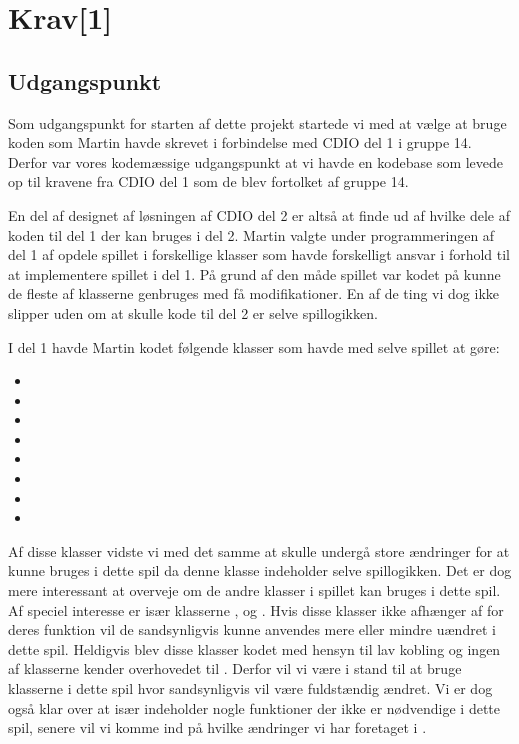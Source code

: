 \chapter{Krav[1]}\label{chap:krav}

\section{Udgangspunkt}\label{sec:krav:kravUdgangspunkt}
Som udgangspunkt for starten af dette projekt startede vi med at vælge at bruge koden som Martin havde skrevet i forbindelse med CDIO del 1 i gruppe 14. Derfor var vores kodemæssige udgangspunkt at vi havde en kodebase som levede op til kravene fra CDIO del 1 som de blev fortolket af gruppe 14.

En del af designet af løsningen af CDIO del 2 er altså at finde ud af hvilke dele af koden til del 1 der kan bruges i del 2. Martin valgte under programmeringen af del 1 af opdele spillet i forskellige klasser som havde forskelligt ansvar i forhold til at implementere spillet i del 1. På grund af den måde spillet var kodet på kunne de fleste af klasserne genbruges med få modifikationer. En af de ting vi dog ikke slipper uden om at skulle kode til del 2 er selve spillogikken.

I del 1 havde Martin kodet følgende klasser som havde med selve spillet at gøre:
\begin{itemize}
\item {}
\item {}
\item {}
\item {}
\item {}
\item {}
\item {}
\item {}
\end{itemize}

Af disse klasser vidste vi med det samme at  skulle undergå store ændringer for at kunne bruges i dette spil da denne klasse indeholder selve spillogikken. Det er dog mere interessant at overveje om de andre klasser i spillet kan bruges i dette spil. Af speciel interesse er især klasserne ,  og . Hvis disse klasser ikke afhænger af  for deres funktion vil de sandsynligvis kunne anvendes mere eller mindre uændret i dette spil. Heldigvis blev disse klasser kodet med hensyn til lav kobling og ingen af klasserne kender overhovedet til . Derfor vil vi være i stand til at bruge klasserne i dette spil hvor  sandsynligvis vil være fuldstændig ændret. Vi er dog også klar over at især  indeholder nogle funktioner der ikke er nødvendige i dette spil, senere vil vi komme ind på hvilke ændringer vi har foretaget i .

